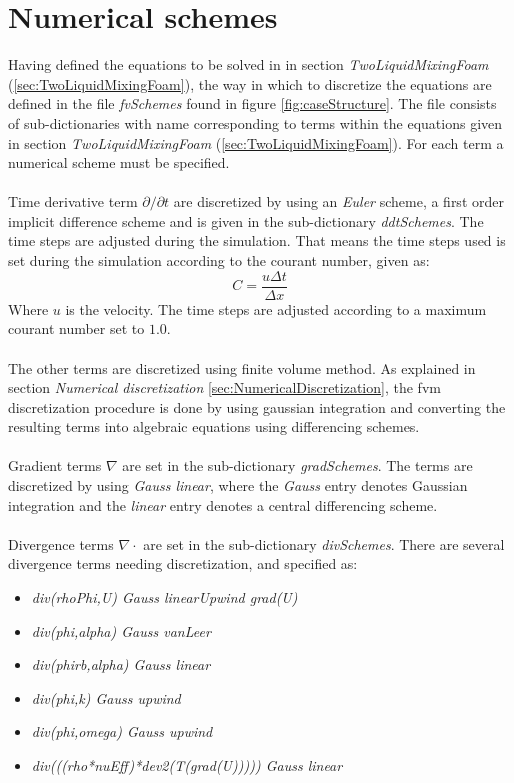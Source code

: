 \documentclass[a4paper, 12pt]{report}
\begin{document}
\section{Numerical schemes}
Having defined the equations to be solved in in section \textit{TwoLiquidMixingFoam} (\ref{sec:TwoLiquidMixingFoam}), the way in which to discretize the equations are defined in the file \textit{fvSchemes} found in figure \ref{fig:caseStructure}. The file consists of sub-dictionaries with name corresponding to terms within the equations given in section \textit{TwoLiquidMixingFoam} (\ref{sec:TwoLiquidMixingFoam}). For each term a numerical scheme must be specified.\\
\\
Time derivative term $\partial / \partial t$ are discretized by using an \textit{Euler} scheme, a first order implicit difference scheme and is given in the sub-dictionary \textit{ddtSchemes}. The time steps are adjusted during the simulation. That means the time steps used is set during the simulation according to the courant number, given as:
\begin{equation}
C = \frac{u \Delta t}{\Delta x}
\label{eqn:courantNumber}
\end{equation}
Where $u$ is the velocity. The time steps are adjusted according to a maximum courant number set to $1.0$.\\
\\
The other terms are discretized using finite volume method. As explained in section \textit{Numerical discretization} \ref{sec:NumericalDiscretization}, the fvm discretization procedure is done by using gaussian integration and converting the resulting terms into algebraic equations using differencing schemes.\\
\\
Gradient terms $\nabla$ are set in the sub-dictionary \textit{gradSchemes}. The terms are discretized by using \textit{Gauss linear}, where the \textit{Gauss} entry denotes Gaussian integration and the \textit{linear} entry denotes a central differencing scheme.\\
\\
Divergence terms $\nabla \cdot$ are set in the sub-dictionary \textit{divSchemes}. There are several divergence terms needing discretization, and specified as:
\begin{itemize}
\item \textit{div(rhoPhi,U) Gauss linearUpwind grad(U)}
\item \textit{div(phi,alpha) Gauss vanLeer}
\item \textit{div(phirb,alpha) Gauss linear}
\item \textit{div(phi,k) Gauss upwind}
\item \textit{div(phi,omega) Gauss upwind}
\item \textit{div(((rho*nuEff)*dev2(T(grad(U))))) Gauss linear}
\end{itemize}
\end{document}
